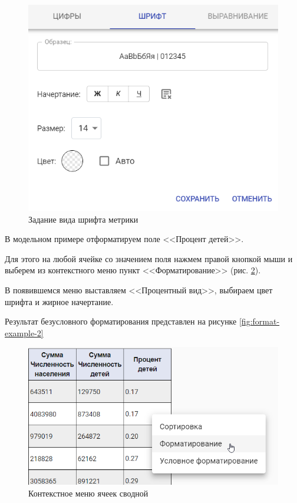 \documentclass[../user-manual.tex]{subfiles}
\begin{document}
	\begin{figure}[h!]
		\centering
		\includegraphics[width=\graphicswidth]{img/13-format-font.png}
		\caption{Задание вида шрифта метрики}
		\label{fig:format-font}
	\end{figure}
	
	\begin{modelExample}
		В модельном примере отформатируем поле <<Процент детей>>.
		
		Для этого на любой ячейке со значением поля нажмем правой кнопкой мыши и выберем из контекстного меню пункт <<Форматирование>> (рис. \ref{fig:format-example-1}).

		В появившемся меню выставляем <<Процентный вид>>, выбираем цвет шрифта и жирное начертание.
		
		Результат безусловного форматирования представлен на рисунке \ref{fig:format-example-2}
	\end{modelExample}

	\begin{figure}[h]
		\centering
		\includegraphics[width=\graphicswidth]{img/14-format-example.png}
		\caption{Контекстное меню ячеек сводной}
		\label{fig:format-example-1}
	\end{figure}
\end{document}
